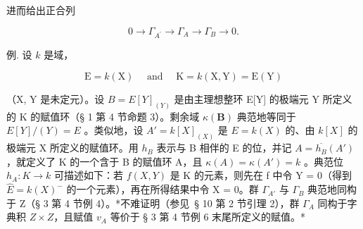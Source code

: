 进而给出正合列

\[
0 \rightarrow \Gamma_ {A ^ {\prime}} \rightarrow \Gamma_ {A} \rightarrow \Gamma_ {B} \rightarrow 0.
\]

例. 设 \(k\) 是域，

\[
\mathrm{E} = k (\mathrm{X}) \quad \text { and } \quad \mathrm{K} = k (\mathrm{X}, \mathrm{Y}) = \mathrm{E} (\mathrm{Y})
\]

（X, Y 是未定元）。设 \(B = E[Y]_{(Y)}\) 是由主理想整环 E{[}Y{]} 的极端元 Y 所定义的 K 的赋值环（§ 1 第 4 节命题 3）。剩余域 \(\kappa(\mathbf{B})\) 典范地等同于 \(E[Y]/(Y) = E\) 。类似地，设 \(A' = k[X]_{(X)}\) 是 \(E = k(X)\) 的、由 \(k[X]\) 的极端元 X 所定义的赋值环。用 \(h_{B}\) 表示与 B 相伴的 E 的位，并记 \(A = \overline{h_{B}}(A')\) ，就定义了 K 的一个含于 B 的赋值环 A，且 \(\kappa(A) = \kappa(A') = k\) 。典范位 \(h_{A}: K \to k\) 可描述如下：若 \(f(X, Y)\) 是 K 的元素，则先在 f 中令 Y = 0（得到 \(\hat{E} = k(X)^{-}\) 的一个元素），再在所得结果中令 X = 0。群 \(\Gamma_{A'}\) 与 \(\Gamma_{B}\) 典范地同构于 Z（§ 3 第 4 节例 4）。*不难证明（参见~§ 10 第 2 节引理 2），群 \(\Gamma_{A}\) 同构于字典积 \(Z \times Z\)，且赋值 \(v_{A}\) 等价于 § 3 第 4 节例 6 末尾所定义的赋值。*


